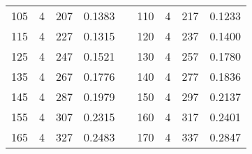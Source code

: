 \documentclass[a4paper, 12pt, french,oneside]{book}
\begin{document}
\begin{table}[!ht]
\begin{tabularx}{\linewidth}{|c|c|c|c|X|c|c|c|c|}
        105          & 4            & 207             & 0.1383                        &  &

        110          & 4            & 217             & 0.1233                                                                                                           \\

        115          & 4            & 227             & 0.1315                        &  &

        120          & 4            & 237             & 0.1400                                                                                                           \\

        125          & 4            & 247             & 0.1521                        &  &

        130          & 4            & 257             & 0.1780                                                                                                           \\

        135          & 4            & 267             & 0.1776                        &  &

        140          & 4            & 277             & 0.1836                                                                                                           \\

        145          & 4            & 287             & 0.1979                        &  &

        150          & 4            & 297             & 0.2137                                                                                                           \\

        155          & 4            & 307             & 0.2315                        &  &

        160          & 4            & 317             & 0.2401                                                                                                           \\

        165          & 4            & 327             & 0.2483                        &  &

        170          & 4            & 337             & 0.2847                                                                                                           \\


\end{tabularx}
\end{table}
\end{document}
